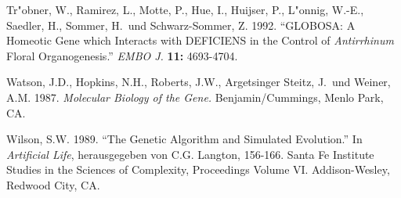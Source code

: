 \begin{thebibliography}{99}
Tr"obner, W., Ramirez, L., Motte, P., Hue, I., Huijser, P., L"onnig, W.-E., Saedler, H.,
Sommer, H.\ und Schwarz-Sommer, Z. 1992. "`GLOBOSA: A Homeotic Gene which Interacts
with DEFICIENS in the Control of \textsl{Antirrhinum} Floral Organogenesis."'
\textsl{EMBO J.} \textbf{11:} 4693-4704.

Watson, J.D., Hopkins, N.H., Roberts, J.W., Argetsinger Steitz, J.\ und Weiner, A.M. 1987. \textsl{Molecular
Biology of the Gene.} Benjamin/Cummings, Menlo Park, CA.

Wilson, S.W. 1989. "`The Genetic Algorithm and Simulated Evolution."' In \textsl{Artificial Life}, 
herausgegeben von C.G. Langton, 156-166. Santa Fe Institute Studies in the Sciences of 
Complexity, Proceedings Volume VI. Addison-Wesley, Redwood City, CA.




\end{thebibliography}

